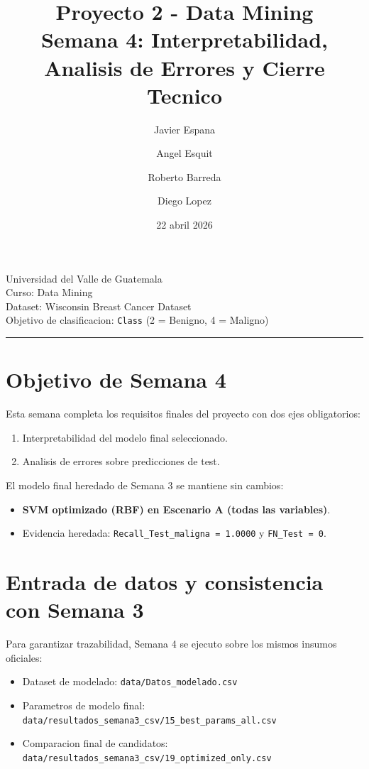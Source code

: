 \documentclass[11pt,a4paper]{article}
\title{Proyecto 2 - Data Mining\\\large Semana 4: Interpretabilidad, Analisis de Errores y Cierre Tecnico}
\author{Javier Espana \and Angel Esquit \and Roberto Barreda \and Diego Lopez}
\date{22 abril 2026}
\begin{document}
\maketitle

\begin{center}
Universidad del Valle de Guatemala\\
Curso: Data Mining\\
Dataset: Wisconsin Breast Cancer Dataset\\
Objetivo de clasificacion: \texttt{Class} (2 = Benigno, 4 = Maligno)
\end{center}

\hrule

\section{Objetivo de Semana 4}

Esta semana completa los requisitos finales del proyecto con dos ejes obligatorios:

\begin{enumerate}[leftmargin=1.2cm]
\item Interpretabilidad del modelo final seleccionado.
\item Analisis de errores sobre predicciones de test.
\end{enumerate}

El modelo final heredado de Semana 3 se mantiene sin cambios:

\begin{itemize}[leftmargin=1.2cm]
\item \textbf{SVM optimizado (RBF) en Escenario A (todas las variables)}.
\item Evidencia heredada: \texttt{Recall\_Test\_maligna = 1.0000} y \texttt{FN\_Test = 0}.
\end{itemize}

\section{Entrada de datos y consistencia con Semana 3}

Para garantizar trazabilidad, Semana 4 se ejecuto sobre los mismos insumos oficiales:

\begin{itemize}[leftmargin=1.2cm]
\item Dataset de modelado: \texttt{data/Datos\_modelado.csv}
\item Parametros de modelo final: \texttt{data/resultados\_semana3\_csv/15\_best\_params\_all.csv}
\item Comparacion final de candidatos: \texttt{data/resultados\_semana3\_csv/19\_optimized\_only.csv}
\end{itemize}
\end{document}
